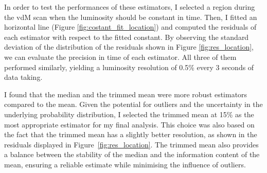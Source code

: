 In order to test the performances of these estimators, I selected a region during the vdM scan when the luminosity should be constant in time. Then, I fitted an horizontal line (Figure \ref{fig:costant_fit_location}) and computed the residuals of each estimator with respect to the fitted constant. By observing the standard deviation of the distribution of the residuals shown in Figure \ref{fig:res_location}, we can evaluate the precision in time of each estimator. All three of them performed similarly, yielding a luminosity resolution of 0.5\% every 3 seconds of data taking.

I found that the median and the trimmed mean were more robust estimators compared to the mean. Given the potential for outliers and the uncertainty in the underlying probability distribution, I selected the trimmed mean at 15\% as the most appropriate estimator for my final analysis. This choice was also based on the fact that the trimmed mean has a slightly better resolution, as shown in the residuals displayed in Figure~\ref{fig:res_location}. The trimmed mean also provides a balance between the stability of the median and the information content of the mean, ensuring a reliable estimate while minimising the influence of outliers.

